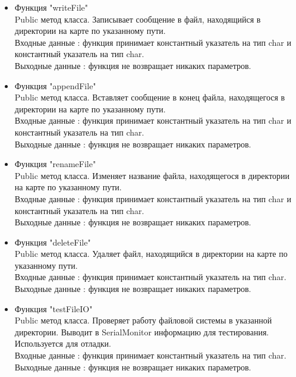 \documentclass[a4document]{article}
\begin{document}
{\begin{itemize}
\begin{itemize}
                Выходные данные : функция не возвращает никаких параметров.
            \item Функция "writeFile" \\
                Public метод класса. Записывает сообщение в файл, находящийся в директории на карте по указанному пути.\\ 
                Входные данные : функция принимает константный указатель на тип char и константный указатель на тип char.\\
                Выходные данные : функция не возвращает никаких параметров.
            \item Функция "appendFile" \\
                Public метод класса. Вставляет сообщение в конец файла, находящегося в директории на карте по указанному пути.\\ 
                Входные данные : функция принимает константный указатель на тип char и константный указатель на тип char.\\
                Выходные данные : функция не возвращает никаких параметров.
            \item Функция "renameFile" \\
                Public метод класса. Изменяет название файла, находящегося в директории на карте по указанному пути. \\ 
                Входные данные : функция принимает константный указатель на тип char и константный указатель на тип char.\\
                Выходные данные : функция не возвращает никаких параметров.
            \newpage
            \item Функция "deleteFile" \\
                Public метод класса. Удаляет файл, находящийся в директории на карте по указанному пути.\\ 
                Входные данные : функция принимает константный указатель на тип char.\\
                Выходные данные : функция не возвращает никаких параметров.
            \item Функция "testFileIO" \\
                Public метод класса. Проверяет работу файловой системы в указанной директории. 
                Выводит в SerialMonitor информацию для тестирования. Используется для отладки.\\
                Входные данные : функция принимает константный указатель на тип char.\\
                Выходные данные : функция не возвращает никаких параметров.
        \end{itemize}
                

\end{itemize}}
\end{document}
